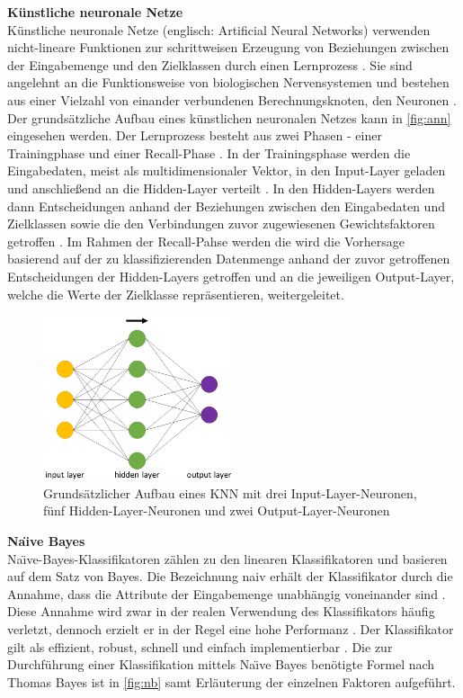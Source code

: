 \textbf{Künstliche neuronale Netze\medskip}\\
Künstliche neuronale Netze (englisch: Artificial Neural Networks) verwenden nicht-lineare Funktionen zur schrittweisen Erzeugung von Beziehungen zwischen der Eingabemenge und den Zielklassen durch einen Lernprozess \cite{Linder2004}. Sie sind angelehnt an die Funktionsweise von biologischen Nervensystemen und bestehen aus einer Vielzahl von einander verbundenen Berechnungsknoten, den Neuronen \cite{OShea2015}. Der grundsätzliche Aufbau eines künstlichen neuronalen Netzes kann in \autoref{fig:ann} eingesehen werden. Der Lernprozess besteht aus zwei Phasen - einer Trainingphase und einer Recall-Phase \cite{Linder2004}. In der Trainingsphase werden die Eingabedaten, meist als multidimensionaler Vektor, in den Input-Layer geladen und anschließend an die Hidden-Layer verteilt \cite{OShea2015}. In den Hidden-Layers werden dann Entscheidungen anhand der Beziehungen zwischen den Eingabedaten und Zielklassen sowie die den Verbindungen zuvor zugewiesenen Gewichtsfaktoren getroffen \cite{Linder2004,OShea2015}. Im Rahmen der Recall-Pahse werden die wird die Vorhersage basierend auf der zu klassifizierenden Datenmenge anhand der zuvor getroffenen Entscheidungen der Hidden-Layers getroffen und an die jeweiligen Output-Layer, welche die Werte der Zielklasse repräsentieren, weitergeleitet\cite{Linder2004}. 

\begin{figure}[H]
    \centering
    \includegraphics[width=0.5\textwidth]{images/ANN}
    \caption{Grundsätzlicher Aufbau eines KNN mit drei Input-Layer-Neuronen, fünf Hidden-Layer-Neuronen und zwei Output-Layer-Neuronen\label{fig:ann}}
\end{figure}

\textbf{Na\"{\i}ve Bayes\medskip}\\
Na\"{\i}ve-Bayes-Klassifikatoren zählen zu den linearen Klassifikatoren und basieren auf dem Satz von Bayes. Die Bezeichnung \glqq naiv\grqq{} erhält der Klassifikator durch die Annahme, dass die Attribute der Eingabemenge unabhängig voneinander sind \cite{Raschka2014}. Diese Annahme wird zwar in der realen Verwendung des Klassifikators häufig verletzt, dennoch erzielt er in der Regel eine hohe Performanz \cite{Raschka2014}. Der Klassifikator gilt als effizient, robust, schnell und einfach implementierbar \cite{Raschka2014}. Die zur Durchführung einer Klassifikation mittels Na\"{\i}ve Bayes benötigte Formel nach Thomas Bayes ist in \autoref{fig:nb} samt Erläuterung der einzelnen Faktoren aufgeführt.

